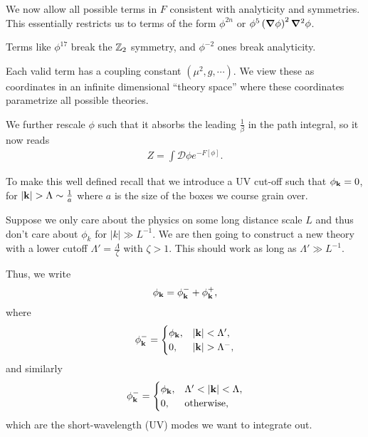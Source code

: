 We now allow all possible terms in $F$ consistent with analyticity and symmetries. This essentially restricts us to terms of the form $\phi^{2n}$ or $\phi^{5} \left( \grad \phi \right)^2 \grad^2 \phi$.

Terms like $\phi^{17}$ break the $\mathbb{Z}_2$ symmetry, and $\phi^{-2}$ ones break analyticity.

Each valid term has a coupling constant $\left( \mu^2, g , \cdots \right) $. We view these as coordinates in an infinite dimensional ``theory space'' where these coordinates parametrize all possible theories. 

We further rescale $\phi$ such that it absorbs the leading $\frac{1}{\beta}$ in the path integral, so it now reads
\begin{align}
    Z = \int \mathcal{D} \phi e^{- F \left[ \phi \right] }
.\end{align}

To make this well defined recall that we introduce a UV cut-off such that $\phi_{\vb{k}} = 0$, for $\left| \vb{k} \right| > \Lambda \sim  \frac{1}{a}$ where $a$ is the size of the boxes we course grain over.


Suppose we only care about the physics on some long distance scale $L$ and thus don't care about $\phi_k$ for $\left| k \right| \gg L^{-1}$. We are then going to construct a new theory with a lower cutoff $\Lambda' = \frac{\Lambda}{\zeta}$ with $\zeta > 1$. This should work as long as $\Lambda' \gg L^{-1}$.

Thus, we write
\begin{align}
    \phi_{\vb{k}} = \phi_{\vb{k}}^{-} + \phi_{\vb{k}}^{+}
,\end{align}
where
\begin{align}
    \phi_{\vb{k}}^{-} = \begin{cases}
        \phi_{\vb{k}}, & \left| \vb{k} \right| < \Lambda',\\
        0, & \left| \vb{k} \right| > \Lambda^{-},
    \end{cases}
\end{align}
and similarly
\begin{align}
    \phi_{\vb{k}}^{-} = \begin{cases}
        \phi_{\vb{k}}, & \Lambda' < \left| \vb{k} \right| < \Lambda,\\
        0, & \text{otherwise,}
    \end{cases}
\end{align}
which are the short-wavelength (UV) modes we want to integrate out. 

